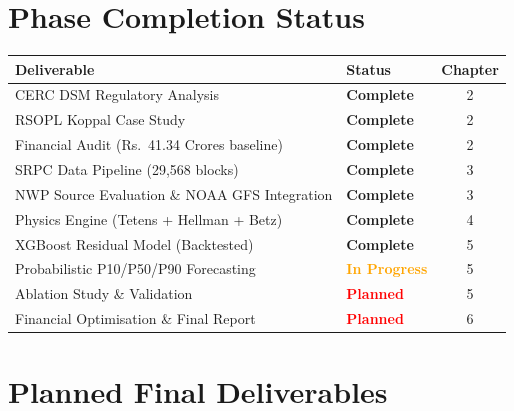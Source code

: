 \documentclass[11pt,a4paper]{article}
\begin{document}
\section{Phase Completion Status}

\begin{center}
\begin{tabular}{p{7.5cm}lc}
  \toprule
  \textbf{Deliverable}                          & \textbf{Status}                        & \textbf{Chapter} \\
  \midrule
  CERC DSM Regulatory Analysis                  & \textcolor{greendone}{\textbf{Complete}} & 2 \\
  RSOPL Koppal Case Study                       & \textcolor{greendone}{\textbf{Complete}} & 2 \\
  Financial Audit (Rs.\ 41.34 Crores baseline)  & \textcolor{greendone}{\textbf{Complete}} & 2 \\
  SRPC Data Pipeline (29,568 blocks)            & \textcolor{greendone}{\textbf{Complete}} & 3 \\
  NWP Source Evaluation \& NOAA GFS Integration & \textcolor{greendone}{\textbf{Complete}} & 3 \\
  Physics Engine (Tetens + Hellman + Betz)      & \textcolor{greendone}{\textbf{Complete}} & 4 \\
  XGBoost Residual Model (Backtested)           & \textcolor{greendone}{\textbf{Complete}} & 5 \\
  Probabilistic P10/P50/P90 Forecasting         & \textcolor{orange}{\textbf{In Progress}} & 5 \\
  Ablation Study \& Validation                  & \textcolor{red}{\textbf{Planned}}        & 5 \\
  Financial Optimisation \& Final Report        & \textcolor{red}{\textbf{Planned}}        & 6 \\
  \bottomrule
\end{tabular}
\end{center}

\section{Planned Final Deliverables}
\end{document}
